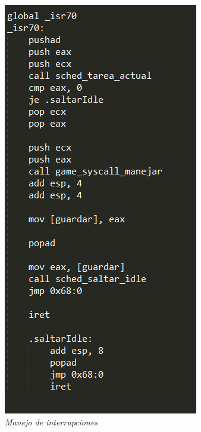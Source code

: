 \begin{figure}[H]
\begin{center}
\includegraphics[width=\linewidth]{ejercicio6/isr0x46.png}
\caption{{\small \textit{Manejo de interrupciones}}}
\endminipage
\end{center}
\end{figure}

